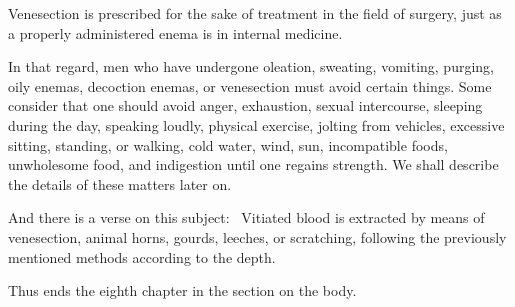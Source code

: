 \begin{translation}
\begin{tt}
\item[23]
Venesection is prescribed for the sake of treatment in the field of surgery, just as a properly administered enema is in internal medicine.

\item[24]
In that regard, men who have undergone oleation, sweating, vomiting, purging, oily enemas, decoction enemas, or venesection must avoid certain things.
Some consider that one should avoid anger, exhaustion, sexual intercourse, sleeping during the day, speaking loudly, physical exercise, jolting from vehicles, excessive sitting, standing, or walking, cold water, wind, sun, incompatible foods, unwholesome food, and indigestion until one regains strength.
We shall describe the details of these matters later on.

\item[25]
And there is a verse on this subject: 
Vitiated blood is extracted by means of venesection, animal horns, gourds, leeches, or scratching, following the previously mentioned methods according to the depth.


Thus ends the eighth chapter in the section on the body.
\end{tt}
\end{translation}